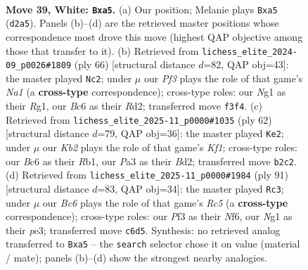 \documentclass[11pt]{article}
\begin{document}
\clearpage

\begin{figure}[p]\centering
\begin{subfigure}{0.46\textwidth}\centering
\resizebox{\linewidth}{!}{%
\newchessgame
\chessboard[
  setfen={6r1/r7/p1B1bk2/pn3ppp/8/PP3PP1/1K1B3P/R4RN1 w - - 5 39},
  showmover=false,
  pgfstyle=straightmove, color=movearrow, markmove={d2-a5}
]}
\caption{}
\end{subfigure}\hfill
\begin{subfigure}{0.46\textwidth}\centering
\resizebox{\linewidth}{!}{%
\newchessgame
\chessboard[
  setfen={4r3/p4p2/3b1rkp/1bp3p1/p7/2P1B1P1/1P1R1P1P/N1K3R1 w - - 4 34},
  showmover=false,
  pgfstyle=straightmove, color=movearrow, markmove={a1-c2}
]}
\caption{}
\end{subfigure}
\\[4pt]
\begin{subfigure}{0.46\textwidth}\centering
\resizebox{\linewidth}{!}{%
\newchessgame
\chessboard[
  setfen={2r5/2r2pk1/3b1pp1/7P/p2P2P1/pnP4R/B2B1P2/1R3K2 w - - 3 32},
  showmover=false,
  pgfstyle=straightmove, color=movearrow, markmove={f1-e2}
]}
\caption{}
\end{subfigure}\hfill
\begin{subfigure}{0.46\textwidth}\centering
\resizebox{\linewidth}{!}{%
\newchessgame
\chessboard[
  setfen={8/3b1p2/3k1npp/1prp4/2rN1PP1/PR2P1KP/6B1/1R6 b - - 8 46},
  showmover=false,
  pgfstyle=straightmove, color=movearrow, markmove={c4-c3}
]}
\caption{}
\end{subfigure}
\caption{\textbf{Move 39, White: \texttt{Bxa5}.} (a) Our position; Melanie plays \texttt{Bxa5} (\texttt{d2a5}). Panels (b)--(d) are the retrieved master positions whose correspondence most drove this move (highest QAP objective among those that transfer to it). (b) Retrieved from \texttt{lichess\_elite\_2024-09\_p0026\#1809} (ply 66) [structural distance $d$=82, QAP obj=43]: the master played \texttt{Nc2}; under $\mu$ our \emph{Pf3} plays the role of that game's \emph{Na1} (a \textbf{cross-type} correspondence); cross-type roles: our \emph{N}g1 as their \emph{R}g1, our \emph{B}c6 as their \emph{R}d2; transferred move \texttt{f3f4}. (c) Retrieved from \texttt{lichess\_elite\_2025-11\_p0000\#1035} (ply 62) [structural distance $d$=79, QAP obj=36]: the master played \texttt{Ke2}; under $\mu$ our \emph{Kb2} plays the role of that game's \emph{Kf1}; cross-type roles: our \emph{B}c6 as their \emph{R}b1, our \emph{P}a3 as their \emph{B}d2; transferred move \texttt{b2c2}. (d) Retrieved from \texttt{lichess\_elite\_2025-11\_p0000\#1984} (ply 91) [structural distance $d$=83, QAP obj=34]: the master played \texttt{Rc3}; under $\mu$ our \emph{Bc6} plays the role of that game's \emph{Rc5} (a \textbf{cross-type} correspondence); cross-type roles: our \emph{P}f3 as their \emph{N}f6, our \emph{N}g1 as their \emph{p}e3; transferred move \texttt{c6d5}. Synthesis: no retrieved analog transferred to \texttt{Bxa5} -- the \texttt{search} selector chose it on value (material / mate); panels (b)--(d) show the strongest nearby analogies.}
\label{fig:thought-m76}
\end{figure}
\end{document}
